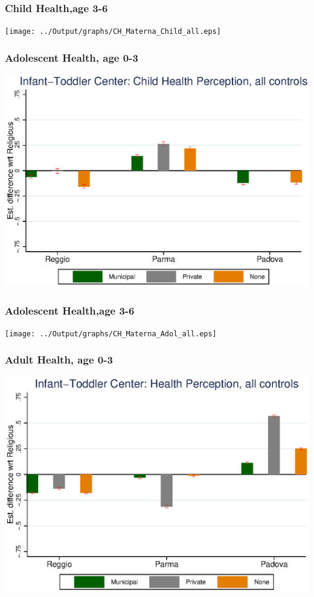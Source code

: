 \documentclass{beamer}
\begin{document}
\begin{frame}\frametitle{Child Health,age 3-6}
\center
\texttt{[image: ../Output/graphs/CH\_Materna\_Child\_all.eps]}
\end{frame}

\begin{frame}\frametitle{Adolescent Health, age 0-3}
\center
\includegraphics[scale=0.7]{../Output/graphs/CH_Asilo_Adol_all.eps}
\end{frame}


\begin{frame}\frametitle{Adolescent Health,age 3-6}
\center
\texttt{[image: ../Output/graphs/CH\_Materna\_Adol\_all.eps]}
\end{frame}

\begin{frame}\frametitle{Adult Health, age 0-3}
\center
\includegraphics[scale=0.7]{../Output/graphs/H_Asilo_Adult_all.eps}
\end{frame}
\end{document}
